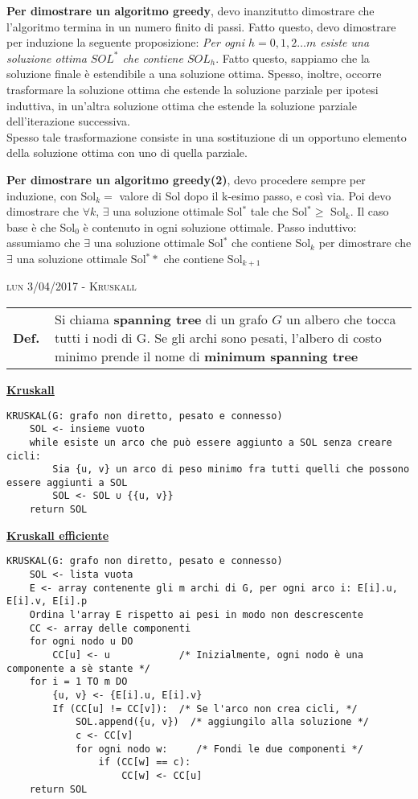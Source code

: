 \documentclass[a4paper,10pt]{article} %
\newcommand{\malgorithm}[1]{%
    {\bigbreak \par \hspace*{4pt} \underline{\textbf {#1}}}}
\newcommand{\msection}[1]{%
    {\newpage\bigbreak \bigbreak \par \hfil \huge \textsc {#1}}\par}
\renewcommand{\b}[1]{%
    {\textbf{#1}}}
\newcommand{\mdef}[1]{%
    {\smallbreak\par\begin{tabular}{ll} \textbf{Def.$\;\;$} & \begin{minipage}[t]{0.80\columnwidth}\normalsize  {#1}\end{minipage}\tabularnewline \end{tabular}}\smallskip\par}
\begin{document}
\medbreak

\b{Per dimostrare un algoritmo greedy}, devo inanzitutto dimostrare che l'algoritmo termina in un numero finito di passi. Fatto questo, devo dimostrare per induzione la seguente proposizione: \emph{Per ogni $h = 0,1,2 \ldots m$ esiste una soluzione ottima $SOL^*$ che contiene $SOL_h$}. Fatto questo, sappiamo che la soluzione finale è estendibile a una soluzione ottima. Spesso, inoltre, occorre trasformare la soluzione ottima che estende la soluzione parziale per ipotesi induttiva, in un'altra soluzione ottima che estende la soluzione parziale dell'iterazione successiva. \\
Spesso tale trasformazione consiste in una sostituzione di un opportuno elemento della soluzione ottima con uno di quella parziale.

\medbreak

\b{Per dimostrare un algoritmo greedy(2)}, devo procedere sempre per induzione, con Sol$_k = $ valore di Sol dopo il k-esimo passo, e così via. Poi devo dimostrare che $\forall k$, $\exists $ una soluzione ottimale Sol$^*$ tale che Sol$^* \geq $ Sol$_k$. Il caso base è che Sol$_0$ è contenuto in ogni soluzione ottimale. Passo induttivo: assumiamo che $\exists$ una soluzione ottimale Sol$^*$ che contiene Sol$_k$ per dimostrare che $\exists$ una soluzione ottimale Sol$^**$ che contiene Sol$_{k+1}$

\medbreak




\msection{lun 3/04/2017 - Kruskall}





\mdef{Si chiama \b{spanning tree} di un grafo $G$ un albero che tocca tutti i nodi di G. Se gli archi sono pesati, l'albero di costo minimo prende il nome di \b{minimum spanning tree}}

\malgorithm{Kruskall}
\begin{lstlisting}
KRUSKAL(G: grafo non diretto, pesato e connesso)
    SOL <- insieme vuoto
    while esiste un arco che può essere aggiunto a SOL senza creare cicli:
        Sia {u, v} un arco di peso minimo fra tutti quelli che possono essere aggiunti a SOL
        SOL <- SOL ∪ {{u, v}}
    return SOL
\end{lstlisting}

\malgorithm{Kruskall efficiente}
\begin{lstlisting}
KRUSKAL(G: grafo non diretto, pesato e connesso)
    SOL <- lista vuota
    E <- array contenente gli m archi di G, per ogni arco i: E[i].u, E[i].v, E[i].p
    Ordina l'array E rispetto ai pesi in modo non descrescente
    CC <- array delle componenti
    for ogni nodo u DO
        CC[u] <- u            /* Inizialmente, ogni nodo è una componente a sè stante */
    for i = 1 TO m DO
        {u, v} <- {E[i].u, E[i].v}
        If (CC[u] != CC[v]):  /* Se l'arco non crea cicli, */
            SOL.append({u, v})  /* aggiungilo alla soluzione */
            c <- CC[v]
            for ogni nodo w:     /* Fondi le due componenti */
                if (CC[w] == c):
                    CC[w] <- CC[u]
    return SOL
\end{lstlisting}
\end{document}
